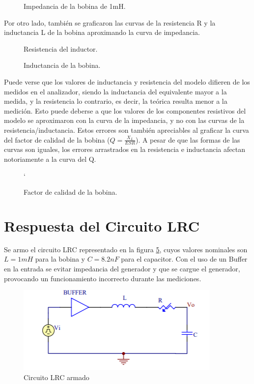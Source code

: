 \begin{figure}[h!]
\centering
\caption{Impedancia de la bobina de 1mH.}
\label{fig:bodeL}
\end{figure}

Por otro lado, también se graficaron las curvas de la resistencia R y la inductancia L de la bobina aproximando la curva de impedancia.

\begin{figure}[h!]
\centering
\caption{Resistencia del inductor.}
\label{fig:RdelL}
\end{figure}

\begin{figure}[h!]
\centering
\caption{Inductancia de la bobina.}
\label{fig:LdelL}
\end{figure}

Puede verse que los valores de inductancia y resistencia del modelo difieren de los medidos en el analizador, siendo la inductancia del equivalente mayor a la medida, y la resistencia lo contrario, es decir, la teórica resulta menor a la medición.  Esto puede deberse a que los valores de los componentes resistivos del modelo se aproximaron con la curva de la impedancia, y no con las curvas de la resistencia/inductancia.
Estos errores son también apreciables al graficar la curva del factor de calidad de la bobina ($Q=\frac{X_L}{ESR}$). A pesar de que las formas de las curvas son iguales, los errores arrastrados en la resistencia e inductancia afectan notoriamente a la curva del Q.

\begin{figure}[h!]
\centering
`%
\caption{Factor de calidad de la bobina.}
\label{fig:QdelL}
\end{figure}

\section{Respuesta del Circuito LRC}

Se armo el circuito LRC representado en la figura \ref{fig:LRC2}, cuyos valores nominales son $L=1mH$ para la bobina y $C=8.2nF$ para el capacitor. Con el uso de un Buffer en la entrada se evitar impedancia del generador y que se cargue el generador, provocando un funcionamiento incorrecto durante las mediciones.

\begin{figure}[h!]
\centering
\includegraphics[scale=0.5]{lrcCircuito.png}
\caption{Circuito LRC armado}
\label{fig:LRC2}
\end{figure}

